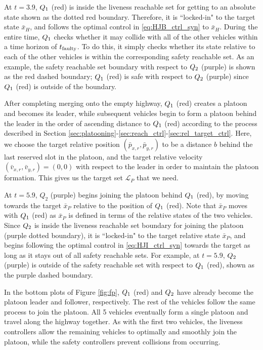 At $t=3.9$, $Q_{1}$ (red) is inside the liveness reachable set for getting to an absolute state shown as the dotted red boundary. Therefore, it is ``locked-in" to the target state $\bar{x}_H$, and follows the optimal control in \eqref{eq:HJB_ctrl_syn} to $\bar{x}_H$. During the entire time, $Q_{1}$ checks whether it may collide with all of the other vehicles within a time horizon of $t_\text{faulty}$. To do this, it simply checks whether its state relative to each of the other vehicles is within the corresponding safety reachable set. As an example, the safety reachable set boundary with respect to $Q_{2}$ (purple) is shown as the red dashed boundary; $Q_{1}$ (red) is safe with respect to $Q_{2}$ (purple) since $Q_{1}$ (red) is outside of the boundary.

After completing merging onto the empty highway, $Q_{1}$ (red) creates a platoon and becomes its leader, while subsequent vehicles begin to form a platoon behind the leader in the order of ascending distance to $Q_{1}$ (red) according to the process described in Section \ref{sec:platooning}-\ref{sec:reach_ctrl}-\ref{sec:rel_target_ctrl}. Here, we choose the target relative position $(\bar{p}_{x,r}, \bar{p}_{y,r})$ to be a distance $b$ behind the last reserved slot in the platoon, and the target relative velocity $(\bar{v}_{x,r}, \bar{v}_{y,r}) = (0,0)$ with respect to the leader in order to maintain the platoon formation. This gives us the target set $\mathcal{L}_P$ that we need.

At $t=5.9$, $Q_2$ (purple) begins joining the platoon behind $Q_{1}$ (red), by moving towards the target $\bar{x}_P$ relative to the position of $Q_{1}$ (red). Note that $\bar{x}_P$ moves with $Q_{1}$ (red) as $\bar{x}_P$ is defined in terms of the relative states of the two vehicles. Since $Q_{2}$ is inside the liveness reachable set boundary for joining the platoon (purple dotted boundary), it is ``locked-in" to the target relative state $\bar{x}_P$, and begins following the optimal control in \eqref{eq:HJI_ctrl_syn} towards the target as long as it stays out of all safety reachable sets. For example, at $t=5.9$, $Q_{2}$ (purple) is outside of the safety reachable set with respect to $Q_{1}$ (red), shown as the purple dashed boundary.

In the bottom plots of Figure \ref{fig:fp}, $Q_{1}$ (red) and $Q_{2}$ have already become the platoon leader and follower, respectively. The rest of the vehicles follow the same process to join the platoon. All 5 vehicles eventually form a single platoon and travel along the highway together. As with the first two vehicles, the liveness controllers allow the remaining vehicles to optimally and smoothly join the platoon, while the safety controllers prevent collisions from occurring.

